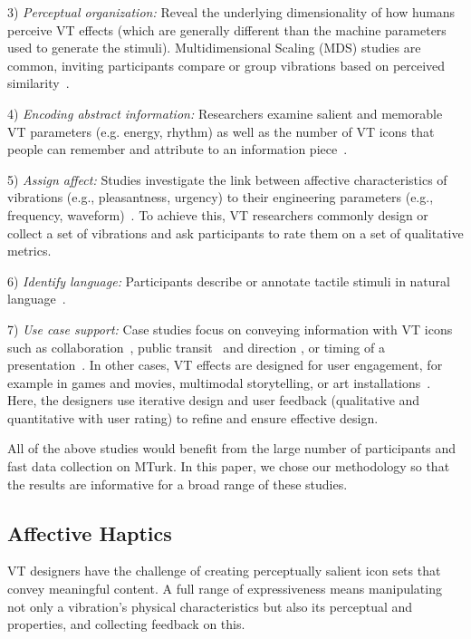 3) {\em Perceptual organization:} Reveal the underlying dimensionality of how humans perceive VT effects (which are generally different than the machine parameters used to generate the stimuli).
Multidimensional Scaling (MDS) studies are common, inviting participants compare or group vibrations based on perceived similarity~\cite{Hollins93,van2003distilling,Pasquero2006,Chan2008,Ternes2008}.

4) {\em Encoding abstract information:} Researchers examine salient and memorable VT parameters (e.g. energy, rhythm) as well as the number of VT icons that people can remember and attribute to an information piece~\cite{Brown2006a,Allen2005,Chan2008,Ternes2008}.

5) {\em Assign affect:} Studies investigate the link between affective characteristics of vibrations (e.g., pleasantness, urgency) to their engineering parameters (e.g., frequency, waveform)~\cite{Ternes2008,affect2015,Raisamo,Koskinen}.
To achieve this, VT researchers commonly design or collect a set of vibrations and ask participants to rate them on a set of qualitative metrics.

6) {\em Identify language:} Participants describe or annotate tactile stimuli in natural language~\cite{Chan2008,Ternes2008,Obrist2013,Guest2011,Hwang2011,Seifi2015}.

7) {\em Use case support:} Case studies focus on conveying information with VT icons such as collaboration~\cite{Chan2008}, public transit~\cite{Brunet2013a} and direction \cite{Brunet2013a,Arab2015}, or timing of a presentation~\cite{presentationtiming}. In other cases, VT effects are designed for user engagement, for example in games and movies, multimodal storytelling, or art installations~\cite{Israr2014,feelcraft}. 
Here, the designers use iterative design and user feedback (qualitative and quantitative with user rating) to refine and ensure effective design.

All of the above studies would benefit from the large number of participants and fast data collection on MTurk.
In this paper, we chose our methodology so that the results are informative for a broad range of these studies.

\subsection{Affective Haptics}
VT designers have the challenge of creating perceptually salient icon sets that convey meaningful content. A full range of expressiveness means manipulating not only 
a vibration's physical characteristics but also its perceptual and %
 properties, and collecting feedback on this.  

